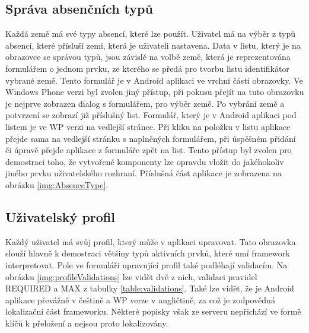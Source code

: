 \subsection{Správa absenčních typů}
Každá země má své typy absencí, které lze použít. Uživatel má na výběr z typů absencí, které přísluší zemi, která je uživateli nastavena. Data v listu, který je na obrazovce se správou typů, jsou závislé na volbě země, která je reprezentována formulářem o jednom prvku, ze kterého se předá pro tvorbu listu identifikátor vybrané země. Tento formulář je v Android aplikaci ve vrchní části obrazovky. Ve Windows Phone verzi byl zvolen jiný přístup, při pokusu přejít na tuto obrazovku je nejprve zobrazen dialog s formulářem, pro výběr země. Po vybrání země a potvrzení se zobrazí již příslušný list. Formulář, který je v Android aplikaci pod listem je ve WP verzi na vedlejší stránce. Při kliku na položku v listu aplikace přejde sama na vedlejší stránku s naplněných formulářem, při úspěšném přidání či úpravě přejde aplikace z formuláře zpět na list. Tento přístup byl zvolen pro demostraci toho, že vytvořené komponenty lze opravdu vložit do jakéhokoliv jiného prvku uživatelského rozhraní. Příslušná část aplikace je zobrazena na obrázku \ref{img:AbsenceType}.
\subsection{Uživatelský profil}
Každý uživatel má svůj profil, který může v aplikaci upravovat. Tato obrazovka slouží hlavně k demostraci většiny typů aktivních prvků, které umí framework interpretovat. Pole ve formuláři upravující profil také podléhají validacím. Na obrázku \ref{img:profileValidations} lze vidět dvě z nich, validaci pravidel REQUIRED a MAX z tabulky \ref{table:validations}. Také lze vidět, že je Android aplikace převážně v češtině a WP verze v angličtině, za což je zodpovědná lokalizační část frameworku. Některé popisky však ze serveru nepřichází ve formě klíčů k přeložení a nejsou proto lokalizovány. 
